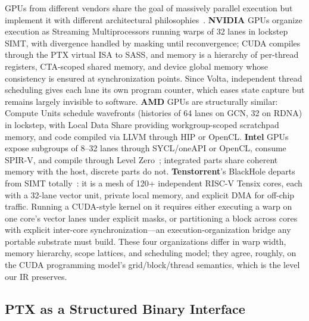 \documentclass[sigplan,nonacm]{acmart}
\begin{document}
GPUs from different vendors share the goal of massively parallel execution
but implement it with different architectural
philosophies~\cite{diamos2010ocelot,huang2023cupbop}.
\textbf{NVIDIA} GPUs organize execution as Streaming Multiprocessors running
warps of 32 lanes in lockstep SIMT, with divergence handled by masking until
reconvergence; CUDA compiles through the PTX virtual ISA to SASS, and memory
is a hierarchy of per-thread registers, CTA-scoped shared memory, and device
global memory whose consistency is ensured at synchronization points.  Since
Volta, independent thread scheduling gives each lane its own program counter,
which eases state capture but remains largely invisible to software.
\textbf{AMD} GPUs are structurally similar: Compute Units schedule wavefronts
(histories of 64 lanes on GCN, 32 on RDNA) in lockstep, with Local Data Share
providing workgroup-scoped scratchpad memory, and code compiled via LLVM
through HIP or OpenCL.  \textbf{Intel} GPUs expose subgroups of 8--32 lanes
through SYCL/oneAPI or OpenCL, consume SPIR-V, and compile through Level
Zero~\cite{spirv,levelzero}; integrated parts share coherent memory with the host, discrete parts do
not.  \textbf{Tenstorrent}'s BlackHole departs from SIMT
totally~\cite{tenstorrent}: it is a
mesh of 120+ independent RISC-V Tensix cores, each with a 32-lane vector
unit, private local memory, and explicit DMA for off-chip traffic.  Running a
CUDA-style kernel on it requires either executing a warp on one core's vector
lanes under explicit masks, or partitioning a block across cores with explicit
inter-core synchronization---an execution-organization bridge any portable
substrate must build.  These four organizations differ in warp width, memory
hierarchy, scope lattices, and scheduling model; they agree, roughly, on the
CUDA programming model's grid/block/thread semantics, which is the level our
IR preserves.

\subsection{PTX as a Structured Binary Interface}
\label{sec:ptx-interface}
\end{document}

